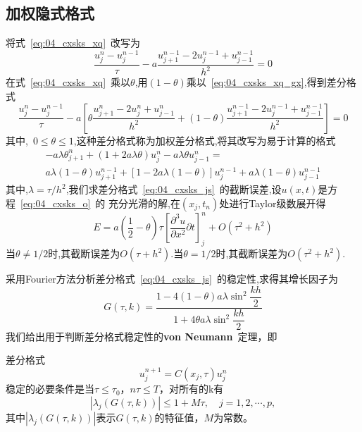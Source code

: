 \subsection{加权隐式格式}
将式~\ref{eq:04_cxsks_xq}~改写为
\begin{equation}\label{eq:04_cxsks_xq_gx}
 \dfrac{u_j^n-u_j^{n-1}}{\tau}-a\dfrac{u_{j+1}^{n-1}-2u_{j}^{n-1}+u_{j-1}^{n-1}}{h^2}=0
\end{equation}
在式~\ref{eq:04_cxsks_xq}~乘以$\theta$,用$(1-\theta)$乘以~\ref{eq:04_cxsks_xq_gx},得到差分格式
\begin{equation}\label{eq:04_cxsks_js}
 \dfrac{u_j^n-u_j^{n-1}}{\tau}-a\left[\theta\dfrac{u_{j+1}^n-2u_j^n+u_{j-1}^n}{h^2}
 +(1-\theta)\dfrac{u_{j+1}^{n-1}-2u_j^{n-1}+u_{j-1}^{n-1}}{h^2}\right]=0
\end{equation}
其中,~$0\leq\theta\leq 1$,这种差分格式称为加权差分格式,将其改写为易于计算的格式
\begin{multline}
 -a\lambda\theta_{j+1}^n+(1+2a\lambda\theta)u_j^n-a\lambda\theta u_{j-1}^n = \\
 a\lambda(1-\theta)u_{j+1}^{n-1}+[1-2a\lambda(1-\theta)]u_j^{n-1}+a\lambda(1-\theta)u_{j-1}^{n-1}
\end{multline}
其中,$\lambda=\tau/h^2$,我们求差分格式~\ref{eq:04_cxsks_js}~的截断误差,设$u(x,t)$是方程~\ref{eq:04_cxsks_o}~的
充分光滑的解,在$(x_j,t_n)$处进行Taylor级数展开得
\begin{equation*}
E=a\left(\dfrac{1}{2}-\theta\right)\tau\left[\dfrac{\partial^3 u}{\partial x^2}{\partial t}\right]_j^n
+O(\tau^2+h^2)
\end{equation*}
当$\theta\not=1/2$时,其截断误差为$O(\tau+h^2)$.当$\theta=1/2$时,其截断误差为$O(\tau^2+h^2)$.\par
采用Fourier方法分析差分格式~\ref{eq:04_cxsks_js}~的稳定性,求得其增长因子为
\begin{equation}
 G(\tau,k)=\dfrac{1-4(1-\theta)a\lambda\sin^2\dfrac{kh}{2}}{1+4\theta a\lambda\sin^2\dfrac{kh}{2}}
\end{equation}
我们给出用于判断差分格式稳定性的\textbf{von Neumann}~定理，即
\begin{Theorem}
差分格式
\begin{equation}
	u^{n+1}_j=C(x_j,\tau)u^n_j
\end{equation}
稳定的必要条件是当$\tau\leq\tau_0$，$n\tau\leq T$，对所有的k有
\begin{equation}
	\left|\lambda_j(G(\tau,k))\right| \leq 1+M\tau,\quad j=1,2,\cdots,p,
\end{equation}
其中$\left|\lambda_j(G(\tau,k))\right|$表示$G(\tau,k)$的特征值，$M$为常数。
\end{Theorem}\par
